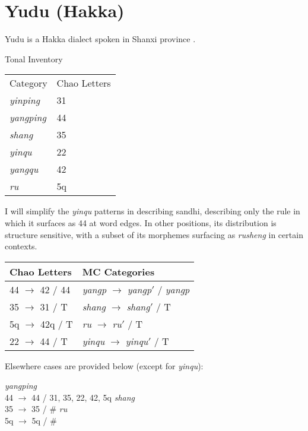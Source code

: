 \documentclass{article}
\begin{document}
\section{Yudu (Hakka)}
Yudu is a Hakka dialect spoken in Shanxi province \cite{Xie1992, chen2000}.
\begin{exe}
\ex Tonal Inventory \\
\begin{tabular}[t]{|ll|}
\hline
Category & Chao Letters \\
\textit{yinping} & 31 \\
\textit{yangping} & 44 \\
\textit{shang} & 35 \\
\textit{yinqu} & 22 \\
\textit{yangqu} & 42 \\
\textit{ru} & 5q \\
\hline
\end{tabular}
\end{exe}
I will simplify the \textit{yinqu} patterns in describing sandhi, describing only the rule in which it surfaces as 44 at word edges. In other positions, its distribution is structure sensitive, with a subset of its morphemes surfacing as \textit{rusheng} in certain contexts. 
\begin{exe}
\ex
\begin{tabular}[t]{ll}
Chao Letters & MC Categories \\
\hline
44 $\rightarrow$ 42 / \underline{\hspace{1em}} 44 & \textit{yangp} $\rightarrow$ \textit{yangp}$'$ / \underline{\hspace{1em}} \textit{yangp} \\ 
35 $\rightarrow$ 31 / \underline{\hspace{1em}} T & \textit{shang} $\rightarrow$ \textit{shang}$'$ / \underline{\hspace{1em}} T \\ 
5q $\rightarrow$ 42q / \underline{\hspace{1em}} T & \textit{ru} $\rightarrow$ \textit{ru}$'$ / \underline{\hspace{1em}} T \\ 
22 $\rightarrow$ 44 / T \underline{\hspace{1em}} & \textit{yinqu} $\rightarrow$ \textit{yinqu}$'$ / T \underline{\hspace{1em}} \\ 
\end{tabular}
\end{exe}
Elsewhere cases are provided below (except for \textit{yinqu}):
\begin{exe}
\ex 
\begin{xlist}
\ex \textit{yangping} \\
44 $\rightarrow$ 44 / \underline{\hspace{1em}} 31, 35, 22, 42, 5q
\ex \textit{shang} \\
35 $\rightarrow$ 35 / \underline{\hspace{1em}} \#
\ex \textit{ru} \\
5q $\rightarrow$ 5q / \underline{\hspace{1em}} \#
\end{xlist}
\end{exe}
\end{document}
